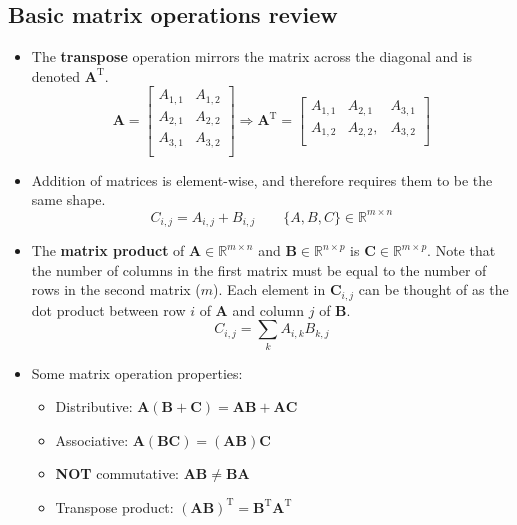\documentclass{article}
\begin{document}
\begin{multicols*}{2}
\subsection{Basic matrix operations review}
\begin{itemize}
    \item The \textbf{transpose} operation mirrors the matrix across the diagonal and is denoted $\bm{A}^\mathrm{T}$.
    $$
    \bm{A} = \begin{bmatrix}
    A_{1,1} & A_{1,2} \\
    A_{2,1} & A_{2,2} \\
    A_{3,1} & A_{3,2} \\
    \end{bmatrix} \Rightarrow
    \bm{A}^\mathrm{T} = \begin{bmatrix}
    A_{1,1} & A_{2,1} & A_{3, 1} \\
    A_{1,2} & A_{2,2}, &  A_{3, 2}\\
    \end{bmatrix}
    $$
    \item Addition of matrices is element-wise, and therefore requires them to be the same shape.
    $$ C_{i,j} = A_{i,j} + B_{i,j} \qquad \{A, B, C\} \in \mathbb{R}^{m \times n} $$
    \item The \textbf{matrix product} of $\bm{A} \in \mathbb{R}^{m \times n}$ and $\bm{B} \in \mathbb{R}^{n \times p}$ is $\bm{C} \in \mathbb{R}^{m \times p}$. Note that the number of columns in the first matrix must be equal to the number of rows in the second matrix ($m$). Each element in $\bm{C}_{i,j}$ can be thought of as the dot product between row $i$ of $\bm{A}$ and column $j$ of $\bm{B}$.
    $$ C_{i,j} = \sum_{k} A_{i,k}B_{k,j}$$
    \item Some matrix operation properties:
    \begin{itemize}
        \item Distributive: $\bm{A}(\bm{B}+\bm{C}) = \bm{AB}+\bm{AC}$
        \item Associative: $\bm{A}(\bm{BC}) = (\bm{AB})\bm{C}$
        \item \textbf{NOT} commutative: $\bm{AB} \neq \bm{BA}$
        \item Transpose product: $(\bm{AB})^\mathrm{T} = \bm{B}^\mathrm{T}\bm{A}^\mathrm{T}$
    \end{itemize}
\end{itemize}


\end{multicols*}
\end{document}
